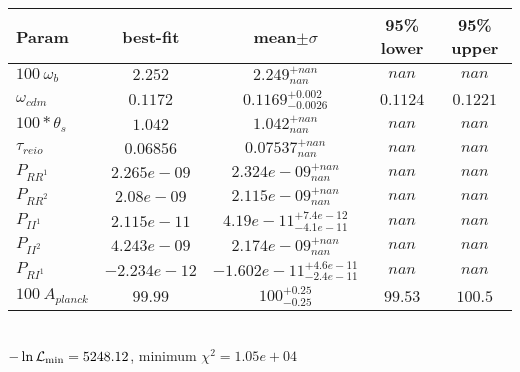 \begin{tabular}{|l|c|c|c|c|} 
 \hline 
Param & best-fit & mean$\pm\sigma$ & 95\% lower & 95\% upper \\ \hline 
$100~\omega_{b }$ &$2.252$ & $2.249_{nan}^{+nan}$ & $nan$ & $nan$ \\ 
$\omega_{cdm }$ &$0.1172$ & $0.1169_{-0.0026}^{+0.002}$ & $0.1124$ & $0.1221$ \\ 
$100*\theta_{s }$ &$1.042$ & $1.042_{nan}^{+nan}$ & $nan$ & $nan$ \\ 
$\tau_{reio }$ &$0.06856$ & $0.07537_{nan}^{+nan}$ & $nan$ & $nan$ \\ 
$P_{{RR}^1 }$ &$2.265e-09$ & $2.324e-09_{nan}^{+nan}$ & $nan$ & $nan$ \\ 
$P_{{RR}^2 }$ &$2.08e-09$ & $2.115e-09_{nan}^{+nan}$ & $nan$ & $nan$ \\ 
$P_{{II}^1 }$ &$2.115e-11$ & $4.19e-11_{-4.1e-11}^{+7.4e-12}$ & $nan$ & $nan$ \\ 
$P_{{II}^2 }$ &$4.243e-09$ & $2.174e-09_{nan}^{+nan}$ & $nan$ & $nan$ \\ 
$P_{{RI}^1 }$ &$-2.234e-12$ & $-1.602e-11_{-2.4e-11}^{+4.6e-11}$ & $nan$ & $nan$ \\ 
$100~A_{planck }$ &$99.99$ & $100_{-0.25}^{+0.25}$ & $99.53$ & $100.5$ \\ 
\hline 
 \end{tabular} \\ 
$-\ln{\cal L}_\mathrm{min} =5248.12$, minimum $\chi^2=1.05e+04$ \\ 

